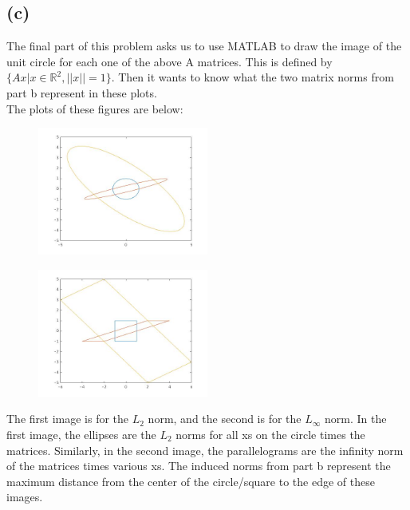 \documentclass{article}
\begin{document}
\subsection*{(c)}
The final part of this problem asks us to use MATLAB to draw the image of the unit circle for each one of the above A matrices. This is defined by $\{Ax\big|x\in\mathbb{R}^2,\lvert\lvert x\rvert\rvert=1\}$. Then it wants to know what the two matrix norms from part b represent in these plots.\\
The plots of these figures are below:
\begin{figure}[h!]
    \centering
    \includegraphics[width=0.5\textwidth]{2norm.jpg}
\end{figure}
\begin{figure}[h!]
    \centering
    \includegraphics[width=0.5\textwidth]{infnorm.jpg}
\end{figure}
The first image is for the $L_2$ norm, and the second is for the $L_\infty$ norm. In the first image, the ellipses are the $L_2$ norms for all xs on the circle times the matrices. Similarly, in the second image, the parallelograms are the infinity norm of the matrices times various xs. The induced norms from part b represent the maximum distance from the center of the circle/square to the edge of these images.
\end{document}
